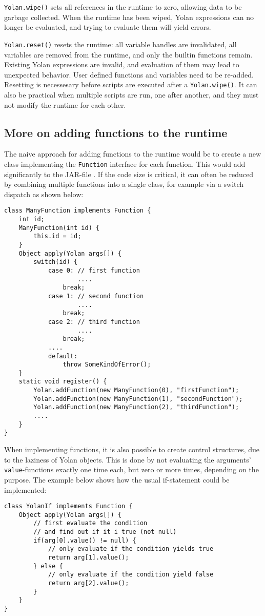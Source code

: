 \documentclass[11pt]{report}
\begin{document}
\verb|Yolan.wipe()| sets all references in the runtime to zero, allowing data to be garbage collected.
When the runtime has been wiped, Yolan expressions can no longer be evaluated, and trying to evaluate them will yield errors. 

\verb|Yolan.reset()| resets the runtime: all variable handles are invalidated, all variables are removed from the runtime, and only the builtin functions remain. Existing Yolan expressions are invalid, and evaluation of them may lead to unexpected behavior. User defined functions and variables need to be re-added.
Resetting is necessesary before scripts are executed after a \verb|Yolan.wipe()|.
It can also be practical when multiple scripts are run, one after another, and they must not modify the runtime for each other.

\subsection{More on adding functions to the runtime}

The naive approach for adding functions to the runtime would be to create a new class implementing the \verb|Function| interface for each function. This would add significantly to the JAR-file
.
If the code size is critical, it can often be reduced by combining multiple functions into a single class, for example via a switch dispatch as shown below:
\begin{lstlisting}
class ManyFunction implements Function {
    int id;
    ManyFunction(int id) {
        this.id = id;
    }
    Object apply(Yolan args[]) {
        switch(id) {
            case 0: // first function
                    ....
                break;
            case 1: // second function
                    ....
                break;
            case 2: // third function
                    ....
                break;
            ....
            default:
                throw SomeKindOfError();
    }
    static void register() {
        Yolan.addFunction(new ManyFunction(0), "firstFunction");
        Yolan.addFunction(new ManyFunction(1), "secondFunction");
        Yolan.addFunction(new ManyFunction(2), "thirdFunction");
        ....
    }
}
\end{lstlisting}

When implementing functions, it is also possible to create control structures, due to the laziness of Yolan objects. This is done by not evaluating the arguments' \verb|value|-functions exactly one time each, but zero or more times, depending on the purpose. The example below shows how the usual if-statement could be implemented:
\begin{lstlisting}
class YolanIf implements Function {
    Object apply(Yolan args[]) {
        // first evaluate the condition
        // and find out if it i true (not null)
        if(arg[0].value() != null) {
            // only evaluate if the condition yields true
            return arg[1].value();
        } else {
            // only evaluate if the condition yield false
            return arg[2].value();
        }
    }
}
\end{lstlisting}
\end{document}
